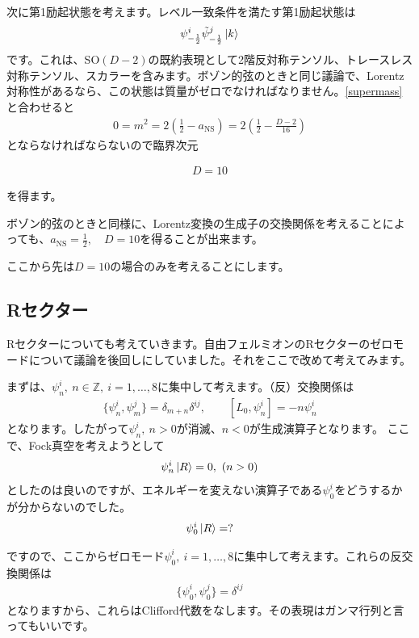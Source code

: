 \documentclass[report,paper=a4, fontsize=12pt, line_length=16cm, number_of_lines=34,dvipdfmx]{jlreq}
\newenvironment{important}{\begin{tcolorbox}[
  colback = white,
  colframe = red!35,
  boxrule = 2mm,
  fonttitle = \bfseries,
  after = \noindent] }{\end{tcolorbox}}
\numberwithin{equation}{chapter}
\numberwithin{equation}{section}
\newcommand{\Zb}{\mathbb{Z}}
\newcommand{\psit}{\tilde{\psi}}
\newcommand{\aNS}{a_{\mathrm{NS}}}
\begin{document}
次に第1励起状態を考えます。レベル一致条件を満たす第1励起状態は
\begin{align}
  \psi_{-\frac12}^{i}\psit_{-\frac12}^{j}\ket{k}
\end{align}
です。これは、SO$(D-2)$の既約表現として2階反対称テンソル、トレースレス対称テンソル、スカラーを含みます。ボゾン的弦のときと同じ議論で、Lorentz対称性があるなら、この状態は質量がゼロでなければなりません。\eqref{supermass}と合わせると
\begin{align}
  0=m^2=2(\frac12 -\aNS)=2(\frac12 -\frac{D-2}{16})
\end{align}
とならなければならないので臨界次元
\begin{important}
  \begin{align}
    D=10
  \end{align}
\end{important}
を得ます。

ボゾン的弦のときと同様に、Lorentz変換の生成子の交換関係を考えることによっても、$\aNS=\frac12,\quad D=10$を得ることが出来ます。

ここから先は$D=10$の場合のみを考えることにします。

\subsection{Rセクター}
Rセクターについても考えていきます。自由フェルミオンのRセクターのゼロモードについて議論を後回しにしていました。それをここで改めて考えてみます。

まずは、$\psi_{n}^{i},\ n\in \Zb,\ i=1,\dots,8$に集中して考えます。（反）交換関係は
\begin{align}
  \{\psi_{n}^{i},\psi_{m}^{j}\}=\delta_{m+n}\delta^{ij},\qquad
  [L_0,\psi^{i}_{n}]=-n\psi^{i}_{n}
\end{align}
となります。したがって$\psi^{i}_{n},\ n>0$が消滅、$n<0$が生成演算子となります。
ここで、Fock真空を考えようとして
\begin{align}
  \psi_{n}^{i}\ket{R}=0,\ (n>0)
\end{align}
としたのは良いのですが、エネルギーを変えない演算子である$\psi^{i}_{0}$をどうするかが分からないのでした。
\begin{align}
  \psi^{i}_{0}\ket{R}=?
\end{align}

ですので、ここからゼロモード$\psi^{i}_{0},\ i=1,\dots,8$に集中して考えます。これらの反交換関係は
\begin{align}
  \{\psi^{i}_{0},\psi^{j}_{0}\}=\delta^{ij}
\end{align}
となりますから、これらはClifford代数をなします。その表現はガンマ行列と言ってもいいです。
\end{document}
